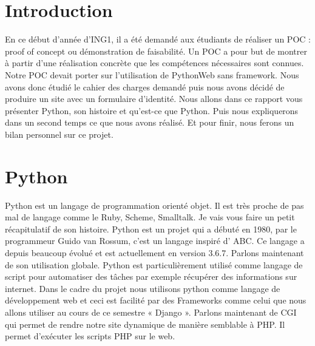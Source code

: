 \documentclass[12pt]{article}
\begin{document}
\tableofcontents
{}
\pagebreak


\section{Introduction}
En ce début d’année d’ING1, il a été demandé aux étudiants de réaliser un POC : proof of concept ou démonstration de faisabilité. Un POC a pour but de montrer à partir d’une réalisation concrète que les compétences nécessaires sont connues.  Notre POC devait porter sur l’utilisation de PythonWeb sans framework. Nous avons donc étudié le cahier des charges demandé puis nous avons décidé de produire un site avec un formulaire d’identité. Nous allons dans ce rapport vous présenter Python, son histoire et qu’est-ce que Python. Puis nous expliquerons dans un second temps ce que nous avons réalisé. Et pour finir, nous ferons un bilan personnel sur ce projet.
\section{Python}
Python est un langage de programmation orienté objet. Il est très proche de pas mal de langage comme le Ruby, Scheme, Smalltalk. Je vais vous faire un petit récapitulatif de son histoire. Python est un projet qui a débuté en 1980, par le programmeur Guido van Rossum, c’est un langage inspiré d’ ABC. Ce langage a depuis beaucoup évolué et est actuellement en version 3.6.7. Parlons maintenant de son utilisation globale. Python est particulièrement utilisé comme langage de script pour automatiser des tâches par exemple récupérer des informations sur internet. Dans le cadre du projet nous utilisons python comme langage de développement web et ceci est facilité par des Frameworks comme celui que nous allons utiliser au cours de ce semestre « Django ». Parlons maintenant de CGI qui permet de rendre notre site dynamique de manière semblable à PHP. Il permet d’exécuter les scripts PHP sur le web.
\end{document}
